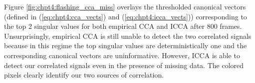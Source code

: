 Figure \ref{fig:chpt4:flashing_cca_miss} overlays the thresholded canonical vectors
(defined in (\ref{eq:chpt4:cca_vects}) and (\ref{eq:chpt4:icca_vects})) corresponding to the
top 2 singular values for both empirical CCA and ICCA after 800 frames. Unsurprisingly,
empirical CCA is still unable to detect the two correlated signals because in this regime
the top singular values are deterministically one and the corresponding canonical vectors
are uninformative. However, ICCA is able to detect our correlated signals even in the
presence of missing data. The colored pixels clearly identify our two sources
of correlation.

\begin{figure}
  \begin{center}
\end{center}
\end{figure}
